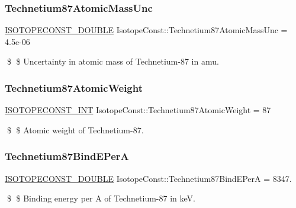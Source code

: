 \subsubsection{\texorpdfstring{Technetium87\+Atomic\+Mass\+Unc}{Technetium87AtomicMassUnc}}
{\footnotesize\ttfamily \mbox{\hyperlink{group___isotope_const-_macros_ga8f45a7272ce02c0b4c65c44636ed719a}{I\+S\+O\+T\+O\+P\+E\+C\+O\+N\+S\+T\+\_\+\+D\+O\+U\+B\+LE}} Isotope\+Const\+::\+Technetium87\+Atomic\+Mass\+Unc = 4.\+5e-\/06}

\$ \$ Uncertainty in atomic mass of Technetium-\/87 in amu. \mbox{\label{group___isotope_const-_technetium-_tc87_ga63e9ff96e3c06e0cabb92a6e81101d38}} 
\subsubsection{\texorpdfstring{Technetium87\+Atomic\+Weight}{Technetium87AtomicWeight}}
{\footnotesize\ttfamily \mbox{\hyperlink{group___isotope_const-_macros_ga5f18360b3e99483a35c32d789e62621c}{I\+S\+O\+T\+O\+P\+E\+C\+O\+N\+S\+T\+\_\+\+I\+NT}} Isotope\+Const\+::\+Technetium87\+Atomic\+Weight = 87}

\$ \$ Atomic weight of Technetium-\/87. \mbox{\label{group___isotope_const-_technetium-_tc87_ga7fa102874375a4d772e539ec4d761bb5}} 
\subsubsection{\texorpdfstring{Technetium87\+Bind\+E\+PerA}{Technetium87BindEPerA}}
{\footnotesize\ttfamily \mbox{\hyperlink{group___isotope_const-_macros_ga8f45a7272ce02c0b4c65c44636ed719a}{I\+S\+O\+T\+O\+P\+E\+C\+O\+N\+S\+T\+\_\+\+D\+O\+U\+B\+LE}} Isotope\+Const\+::\+Technetium87\+Bind\+E\+PerA = 8347.}

\$ \$ Binding energy per A of Technetium-\/87 in keV. \mbox{\label{group___isotope_const-_technetium-_tc87_ga5df0ec1732f8594810e5455b95135b24}} 
